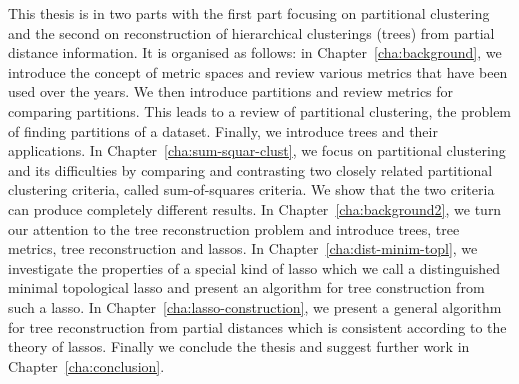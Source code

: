 This thesis is in two parts with the first part focusing on partitional
clustering and the second on reconstruction of hierarchical clusterings
(trees) from partial distance information.  It is organised as follows: in
Chapter~\ref{cha:background}, we introduce the concept of metric spaces and
review various metrics that have been used over the years.  We then introduce
partitions and review metrics for comparing partitions.  This leads to a
review of partitional clustering, the problem of finding partitions of a
dataset.  Finally, we introduce trees and their applications.  In
Chapter~\ref{cha:sum-squar-clust}, we focus on partitional clustering and its
difficulties by comparing and contrasting two closely related partitional
clustering criteria, called sum-of-squares criteria.  We show that the two
criteria can produce completely different results.  In
Chapter~\ref{cha:background2}, we turn our attention to the tree
reconstruction problem and introduce trees, tree metrics, tree reconstruction
and lassos.  In Chapter~\ref{cha:dist-minim-topl}, we investigate the
properties of a special kind of lasso which we call a distinguished minimal
topological lasso and present an algorithm for tree construction from such a
lasso.  In Chapter~\ref{cha:lasso-construction}, we present a general
algorithm for tree reconstruction from partial distances which is consistent
according to the theory of lassos.  Finally we conclude the thesis and suggest
further work in Chapter~\ref{cha:conclusion}.

